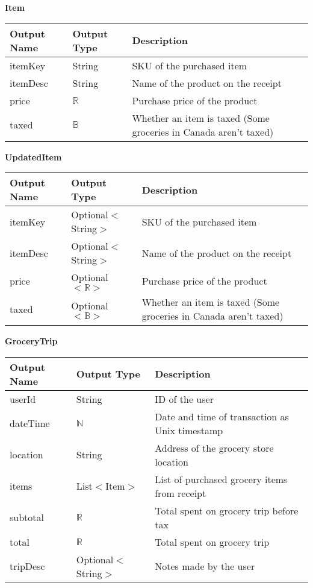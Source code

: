 \documentclass[12pt, titlepage]{article}
\begin{document}
\textbf{Item}

\begin{table}[H]
  \begin{tabular}{|p{}|p{}|p{}|}
    \hline
    \textbf{Output Name} & \textbf{Output Type} & \textbf{Description} \\
    \hline
    itemKey & String & SKU of the purchased item \\
    \hline
    itemDesc & String & Name of the product on the receipt \\
    \hline
    price & $\mathbb{R}$ & Purchase price of the product \\
    \hline
    taxed & $\mathbb{B}$ & Whether an item is taxed (Some groceries in Canada aren't taxed) \\
    \hline
  \end{tabular}
\end{table}

\textbf{UpdatedItem}

\begin{table}[H]
  \begin{tabular}{|p{}|p{}|p{}|}
    \hline
    \textbf{Output Name} & \textbf{Output Type} & \textbf{Description} \\
    \hline
    itemKey & Optional$<$String$>$ & SKU of the purchased item \\
    \hline
    itemDesc & Optional$<$String$>$ & Name of the product on the receipt \\
    \hline
    price & Optional$<\mathbb{R}>$ & Purchase price of the product \\
    \hline
    taxed & Optional$<\mathbb{B}>$ & Whether an item is taxed (Some groceries in Canada aren't taxed) \\
    \hline
  \end{tabular}
\end{table}

\textbf{GroceryTrip}

\begin{table}[H]
  \begin{tabular}{|p{}|p{}|p{}|}
    \hline
    \textbf{Output Name} & \textbf{Output Type} & \textbf{Description} \\
    \hline
    userId & String & ID of the user \\
    \hline
    dateTime & $\mathbb{N}$ & Date and time of transaction as Unix timestamp \\
    \hline
    location & String & Address of the grocery store location \\
    \hline
    items & List$<$Item$>$ & List of purchased grocery items from receipt \\
    \hline
    subtotal & $\mathbb{R}$ & Total spent on grocery trip before tax \\
    \hline
    total & $\mathbb{R}$ & Total spent on grocery trip \\
    \hline
    tripDesc & Optional$<$String$>$ & Notes made by the user \\
    \hline
  \end{tabular}
\end{table}
\end{document}
